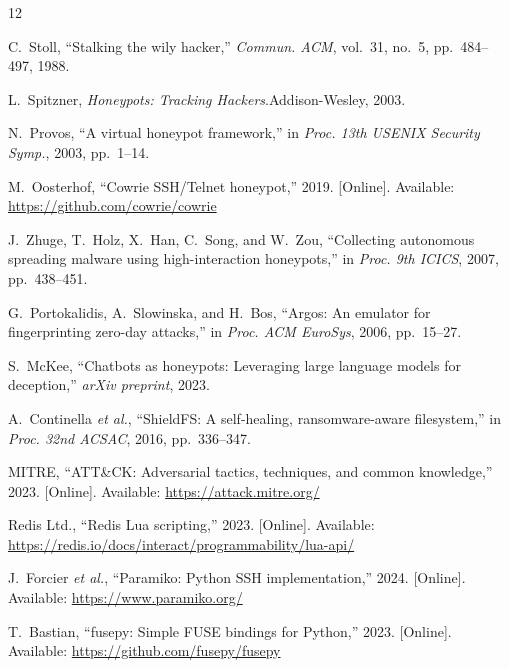 \documentclass[conference]{IEEEtran}
\begin{document}
\begin{thebibliography}{12}

C.~Stoll, ``Stalking the wily hacker,'' \emph{Commun. ACM}, vol.~31, no.~5, pp.~484--497, 1988.

L.~Spitzner, \emph{Honeypots: Tracking Hackers}.\hspace{1em}Addison-Wesley, 2003.

N.~Provos, ``A virtual honeypot framework,'' in \emph{Proc. 13th USENIX Security Symp.}, 2003, pp.~1--14.

M.~Oosterhof, ``Cowrie SSH/Telnet honeypot,'' 2019. [Online]. Available: \url{https://github.com/cowrie/cowrie}

J.~Zhuge, T.~Holz, X.~Han, C.~Song, and W.~Zou, ``Collecting autonomous spreading malware using high-interaction honeypots,'' in \emph{Proc. 9th ICICS}, 2007, pp.~438--451.

G.~Portokalidis, A.~Slowinska, and H.~Bos, ``Argos: An emulator for fingerprinting zero-day attacks,'' in \emph{Proc. ACM EuroSys}, 2006, pp.~15--27.

S.~McKee, ``Chatbots as honeypots: Leveraging large language models for deception,'' \emph{arXiv preprint}, 2023.

A.~Continella \emph{et al.}, ``ShieldFS: A self-healing, ransomware-aware filesystem,'' in \emph{Proc. 32nd ACSAC}, 2016, pp.~336--347.

MITRE, ``ATT\&CK: Adversarial tactics, techniques, and common knowledge,'' 2023. [Online]. Available: \url{https://attack.mitre.org/}

Redis Ltd., ``Redis Lua scripting,'' 2023. [Online]. Available: \url{https://redis.io/docs/interact/programmability/lua-api/}

J.~Forcier \emph{et al.}, ``Paramiko: Python SSH implementation,'' 2024. [Online]. Available: \url{https://www.paramiko.org/}

T.~Bastian, ``fusepy: Simple FUSE bindings for Python,'' 2023. [Online]. Available: \url{https://github.com/fusepy/fusepy}

\end{thebibliography}

\balance
\end{document}
